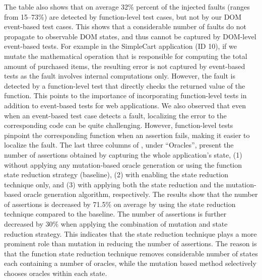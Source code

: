 The table also shows that on average 32\% percent of the injected faults (ranges from 15--73\%) are detected by function-level test cases, but not by our DOM event-based test cases. This shows that a considerable number of faults do not propagate to observable DOM states, and thus cannot be captured by DOM-level event-based tests. 
For example in the SimpleCart application (ID 10), if we mutate the mathematical operation that is responsible for computing the total amount of purchased items, the resulting error is not captured by event-based tests as the fault involves internal computations only. However, the fault is detected by a function-level test that directly checks the returned value of the function.
This points to the importance of incorporating function-level tests in addition to event-based tests for \javascript web applications. We also observed that even when an event-based test case detects a \javascript fault, localizing the error to the corresponding \javascript code can be quite challenging. However, function-level tests pinpoint the  corresponding function when an assertion fails, making it easier to localize the fault. 
The last three columns of , under ``Oracles'', present the number of assertions obtained by capturing the whole application's state,  (1) without applying any mutation-based oracle generation or using the function state reduction strategy (baseline), (2) with enabling the state reduction technique only, and (3) with applying both the state reduction and the mutation-based oracle generation algorithm, respectively. 
The results show that the number of assertions is decreased by 71.5\% on average by using the state reduction technique compared to the baseline. 
The number of assertions is further decreased by 30\% when applying the combination of mutation and state reduction strategy.
This indicates that the state reduction technique plays a more prominent role than mutation in reducing the number of assertions. The reason is that the function state reduction technique removes considerable number of states each containing a number of oracles, while the mutation based method selectively chooses oracles within each state. 
